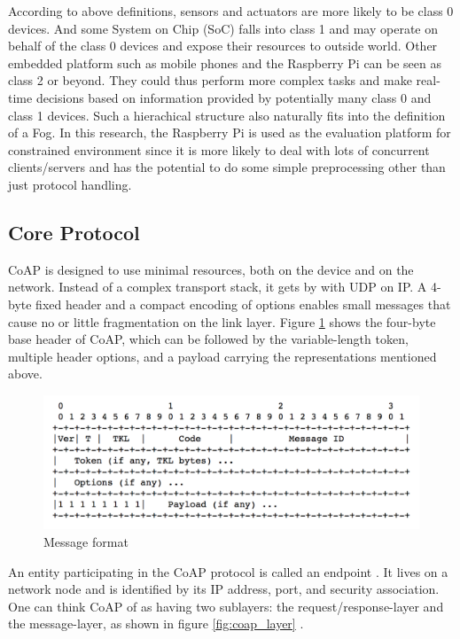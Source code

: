 According to above definitions, sensors and actuators are more likely to be class 0 devices. And some System on Chip (SoC) falls into class 1 and may operate on behalf of the class 0 devices and expose their resources to outside world. Other embedded platform such as mobile phones and the Raspberry Pi \cite{raspberry_pi} can be seen as class 2 or beyond. They could thus perform more complex tasks and make real-time decisions based on information provided by potentially many class 0 and class 1 devices. Such a hierachical structure also naturally fits into the definition of a Fog. In this research, the Raspberry Pi is used as the evaluation platform for constrained environment since it is more likely to deal with lots of concurrent clients/servers and has the potential to do some simple preprocessing other than just protocol handling.


\subsection{Core Protocol}\label{core_protocol}

CoAP is designed to use minimal resources, both on the device and on the network. Instead of a complex transport stack, it gets by with UDP on IP. A 4-byte fixed header and a compact encoding of options enables small messages that cause no or little fragmentation on the link layer. Figure \ref{fig:msg_format} \cite{coap_protocol} shows the four-byte base header of CoAP, which can be followed by the variable-length token, multiple header options, and a payload carrying the representations mentioned above.

\begin{figure}[!htbp]
\centering
\includegraphics[scale = 0.55]{msg_format.png}
\caption{Message format}
\label{fig:msg_format}
\end{figure}

An entity participating in the CoAP protocol is called an endpoint \cite{coap_protocol}. It lives on a network node and is identified by its IP address, port, and security association. One can think CoAP of as having two sublayers: the request/response-layer and the message-layer, as shown in figure \ref{fig:coap_layer} \cite{coap_protocol}.

